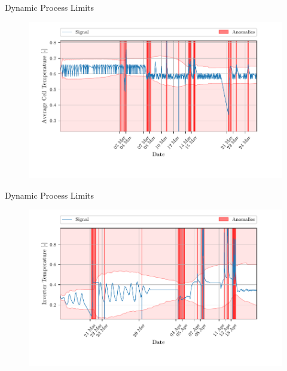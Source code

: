 \documentclass{beamer}
\begin{document}
\begin{frame}{Dynamic Process Limits}
    \begin{figure}[htpb]
        \begin{center}
            \includegraphics[width=\linewidth]{figures/Average_Cell_Temperature_sliding_thresh_.pdf}
        \end{center}
    \end{figure}
\end{frame}

\begin{frame}{Dynamic Process Limits}
    \begin{figure}[htpb]
        \begin{center}
            \includegraphics[width=\linewidth]{figures/Inverter_Temperature_sliding_thresh.pdf}
        \end{center}
    \end{figure}
\end{frame}
\end{document}
